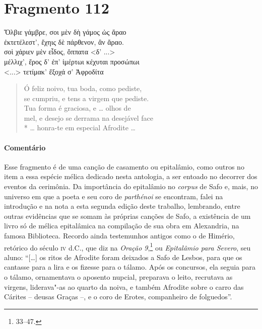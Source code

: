 \pagebreak

\section{Fragmento 112}

\begin{gkverse}
Ὄλβιε γάμβρε, σοι μὲν δὴ γάμος ὠς ἄραο\\
ἐκτετέλεστ’, ἔχηις δὲ πάρθενον, ἂν ἄραο.\\
σοὶ χάριεν μὲν εἶδος, ὄππατα <δ’ ...>\\
μέλλιχ’, ἔρος δ’ ἐπ’ ἰμέρτωι κέχυται προσώπωι\\
<...> τετίμακ’ ἔξοχά σ’ Ἀφροδίτα
\end{gkverse}

\begin{verse}
Ó feliz noivo, tua boda, como pediste,\\
se cumpriu, e tens a virgem que pediste.\\
Tua forma é graciosa, e \ldots{} olhos de\\
mel, e desejo se derrama na desejável face\\*
\ldots{} honra-te em especial Afrodite \ldots{}
\end{verse}

\medskip

\paragraph{Comentário} Esse fragmento é de uma canção de casamento ou epitalâmio, como outros no item a essa espécie mélica dedicado nesta antologia, a ser entoado no decorrer dos eventos da cerimônia.
Da importância do epitalâmio no \textit{corpus} de Safo e, mais, no universo em que a poeta e seu coro de \textit{parthénoi} se encontram, falei na introdução e na nota a esta segunda edição deste trabalho, lembrando, entre outras evidências que se somam às próprias canções de Safo, a existência de um livro só de mélica epitalâmica na compilação de sua obra  em Alexandria, na famosa Biblioteca. Recordo ainda testemunhos antigos como o de Himério, retórico do século \textsc{iv} d.C., que diz na \textit{Oração 9},\footnote{33--47.} ou \textit{Epitalâmio para Severo}, seu aluno: ``[\ldots{}] os ritos de Afrodite foram deixados a Safo de Lesbos, para que os cantasse para a lira e os fizesse para o tálamo. Após os concursos, ela seguia para o tálamo, ornamentava o aposento nupcial, preparava o leito, recrutava as virgens, liderava"-as ao quarto da noiva, e também Afrodite sobre o carro das Cárites -- deusas Graças --, e o coro de Erotes, companheiro de folguedos''.

